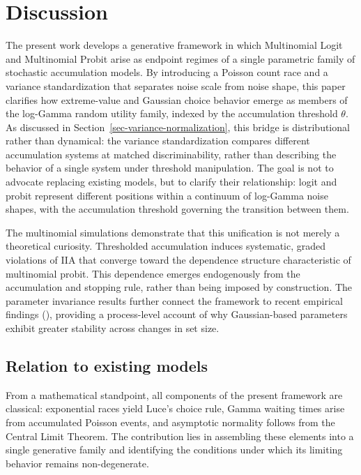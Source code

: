 \documentclass[
  man,
  floatsintext,
  longtable,
  a4paper,
  nolmodern,
  notxfonts,
  notimes,
  colorlinks=true,linkcolor=blue,citecolor=blue,urlcolor=blue]{apa7}
\begin{document}
\section{Discussion}\label{sec-discussion}

The present work develops a generative framework in which Multinomial
Logit and Multinomial Probit arise as endpoint regimes of a single
parametric family of stochastic accumulation models. By introducing a
Poisson count race and a variance standardization that separates noise
scale from noise shape, this paper clarifies how extreme-value and
Gaussian choice behavior emerge as members of the log-Gamma random
utility family, indexed by the accumulation threshold \(\theta\). As
discussed in Section~\ref{sec-variance-normalization}, this bridge is
distributional rather than dynamical: the variance standardization
compares different accumulation systems at matched discriminability,
rather than describing the behavior of a single system under threshold
manipulation. The goal is not to advocate replacing existing models, but
to clarify their relationship: logit and probit represent different
positions within a continuum of log-Gamma noise shapes, with the
accumulation threshold governing the transition between them.

The multinomial simulations demonstrate that this unification is not
merely a theoretical curiosity. Thresholded accumulation induces
systematic, graded violations of IIA that converge toward the dependence
structure characteristic of multinomial probit. This dependence emerges
endogenously from the accumulation and stopping rule, rather than being
imposed by construction. The parameter invariance results further
connect the framework to recent empirical findings
(),
providing a process-level account of why Gaussian-based parameters
exhibit greater stability across changes in set size.

\subsection{Relation to existing
models}\label{relation-to-existing-models}

From a mathematical standpoint, all components of the present framework
are classical: exponential races yield Luce's choice rule, Gamma waiting
times arise from accumulated Poisson events, and asymptotic normality
follows from the Central Limit Theorem. The contribution lies in
assembling these elements into a single generative family and
identifying the conditions under which its limiting behavior remains
non-degenerate.
\end{document}
